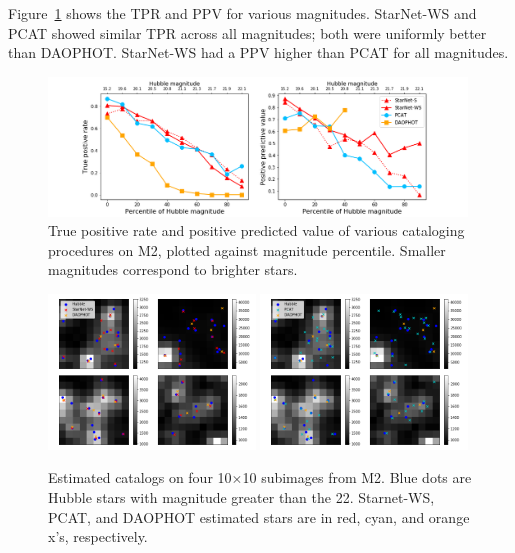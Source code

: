 

Figure~\ref{fig:summary_stats} shows the TPR and PPV for various magnitudes.
StarNet-WS and PCAT showed similar TPR across all magnitudes; both were
uniformly better than DAOPHOT. StarNet-WS had a PPV higher than PCAT for all magnitudes. 
\begin{figure}[ht]
    \centering
    \includegraphics[width=0.99\textwidth]{figures/summary_statistics_m2.png}
    \caption{True positive rate and positive predicted value of various cataloging
    procedures on M2, plotted against magnitude percentile.
    Smaller magnitudes correspond to brighter stars. }
    \label{fig:summary_stats}
\end{figure}

\begin{figure}[H]
    \centering
    \includegraphics[width=0.49\textwidth]{figures/example_subimages_ws.png}
    \includegraphics[width=0.49\textwidth]{figures/example_subimages_pcat.png}
    \caption{Estimated catalogs on four 10$\times$10 subimages from
    M2. Blue dots are Hubble stars with magnitude greater than the 22.
    Starnet-WS, PCAT, and DAOPHOT estimated stars are in
    red, cyan, and orange x's, respectively. }
    \label{fig:example_subimages}
\end{figure}

